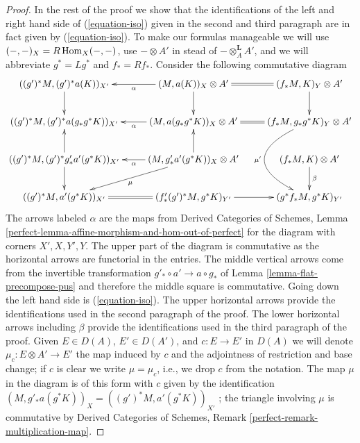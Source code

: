 \begin{proof}
\medskip\noindent
In the rest of the proof we show that the identifications of
the left and right hand side of (\ref{equation-iso})
given in the second and third paragraph are in fact given by
(\ref{equation-iso}). To make our formulas manageable
we will use $(-, -)_X = R\mathop{\mathrm{Hom}}\nolimits_X(-, -)$, use $- \otimes A'$
in stead of $- \otimes_A^\mathbf{L} A'$, and we will abbreviate
$g^* = Lg^*$ and $f_* = Rf_*$. Consider the following
commutative diagram
$$
\xymatrix{
((g')^*M, (g')^*a(K))_{X'} \ar[d] &
(M, a(K))_X \otimes A' \ar[l]^-\alpha \ar[d] &
(f_*M, K)_Y \otimes A' \ar@{=}[l] \ar[d] \\
((g')^*M, (g')^*a(g_*g^*K))_{X'} &
(M, a(g_*g^*K))_X \otimes A' \ar[l]^-\alpha &
(f_*M, g_*g^*K)_Y \otimes A' \ar@{=}[l] \ar@/_4pc/[dd]_{\mu'} \\
((g')^*M, (g')^*g'_*a'(g^*K))_{X'} \ar[u] \ar[d] &
(M, g'_*a'(g^*K))_X \otimes A' \ar[u] \ar[l]^-\alpha \ar[ld]^\mu &
(f_*M, K) \otimes A' \ar[d]^\beta \\
((g')^*M, a'(g^*K))_{X'} &
(f'_*(g')^*M, g^*K)_{Y'} \ar@{=}[l] \ar[r] &
(g^*f_*M, g^*K)_{Y'}
}
$$
The arrows labeled $\alpha$ are the maps from
Derived Categories of Schemes, Lemma
\ref{perfect-lemma-affine-morphism-and-hom-out-of-perfect}
for the diagram with corners $X', X, Y', Y$.
The upper part of the diagram is commutative as the horizontal arrows are
functorial in the entries.
The middle vertical arrows come from the invertible transformation
$g'_* \circ a' \to a \circ g_*$  of Lemma \ref{lemma-flat-precompose-pus}
and therefore the middle square is commutative.
Going down the left hand side is (\ref{equation-iso}).
The upper horizontal arrows provide the identifications used in the
second paragraph of the proof.
The lower horizontal arrows including $\beta$ provide the identifications
used in the third paragraph of the proof. Given $E \in D(A)$,
$E' \in D(A')$, and $c : E \to E'$ in $D(A)$ we will denote
$\mu_c : E \otimes A' \to E'$ the map induced by $c$
and the adjointness of restriction and base change;
if $c$ is clear we write $\mu = \mu_c$, i.e., we
drop $c$ from the notation. The map $\mu$ in the diagram is of this
form with $c$ given by the identification
$(M, g'_*a(g^*K))_X = ((g')^*M, a'(g^*K))_{X'}$
; the triangle involving $\mu$ is commutative by
Derived Categories of Schemes, Remark \ref{perfect-remark-multiplication-map}.


\end{proof}
